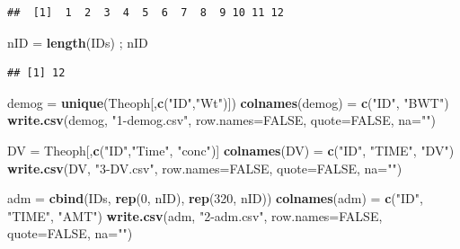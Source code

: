 \documentclass[11pt,]{krantz}
\makeatletter
\newenvironment{Shaded}{\begin{snugshade}}{\end{snugshade}}
\newcommand{\KeywordTok}[1]{\textcolor[rgb]{0.13,0.29,0.53}{\textbf{#1}}}
\newcommand{\DataTypeTok}[1]{\textcolor[rgb]{0.13,0.29,0.53}{#1}}
\newcommand{\DecValTok}[1]{\textcolor[rgb]{0.00,0.00,0.81}{#1}}
\newcommand{\StringTok}[1]{\textcolor[rgb]{0.31,0.60,0.02}{#1}}
\newcommand{\OtherTok}[1]{\textcolor[rgb]{0.56,0.35,0.01}{#1}}
\newcommand{\NormalTok}[1]{#1}
\newenvironment{kframe}{%
\medskip{}
\setlength{\fboxsep}{.8em}
 \def\at@end@of@kframe{}%
 \ifinner\ifhmode%
  \def\at@end@of@kframe{\end{minipage}}%
  \begin{minipage}{\columnwidth}%
 \fi\fi%
 \def\FrameCommand##1{\hskip\@totalleftmargin \hskip-\fboxsep
 \colorbox{shadecolor}{##1}\hskip-\fboxsep
     \hskip-\linewidth \hskip-\@totalleftmargin \hskip\columnwidth}%
 \MakeFramed {\advance\hsize-\width
   \@totalleftmargin\z@ \linewidth\hsize
   \@setminipage}}%
 {\par\unskip\endMakeFramed%
 \at@end@of@kframe}
\renewenvironment{Shaded}{\begin{kframe}}{\end{kframe}}
\theoremstyle{definition}
\theoremstyle{definition}
\theoremstyle{remark}
\makeatother
\begin{document}
\begin{verbatim}
##  [1]  1  2  3  4  5  6  7  8  9 10 11 12
\end{verbatim}

\begin{Shaded}
\begin{Highlighting}[]
\NormalTok{nID =}\StringTok{ }\KeywordTok{length}\NormalTok{(IDs) ; nID}
\end{Highlighting}
\end{Shaded}

\begin{verbatim}
## [1] 12
\end{verbatim}

\begin{Shaded}
\begin{Highlighting}[]
\NormalTok{demog =}\StringTok{ }\KeywordTok{unique}\NormalTok{(Theoph[,}\KeywordTok{c}\NormalTok{(}\StringTok{"ID"}\NormalTok{,}\StringTok{"Wt"}\NormalTok{)])}
\KeywordTok{colnames}\NormalTok{(demog) =}\StringTok{ }\KeywordTok{c}\NormalTok{(}\StringTok{"ID"}\NormalTok{, }\StringTok{"BWT"}\NormalTok{)}
\KeywordTok{write.csv}\NormalTok{(demog, }\StringTok{"1-demog.csv"}\NormalTok{, }\DataTypeTok{row.names=}\OtherTok{FALSE}\NormalTok{, }\DataTypeTok{quote=}\OtherTok{FALSE}\NormalTok{, }\DataTypeTok{na=}\StringTok{""}\NormalTok{)}

\NormalTok{DV =}\StringTok{ }\NormalTok{Theoph[,}\KeywordTok{c}\NormalTok{(}\StringTok{"ID"}\NormalTok{,}\StringTok{"Time"}\NormalTok{, }\StringTok{"conc"}\NormalTok{)]}
\KeywordTok{colnames}\NormalTok{(DV) =}\StringTok{ }\KeywordTok{c}\NormalTok{(}\StringTok{"ID"}\NormalTok{, }\StringTok{"TIME"}\NormalTok{, }\StringTok{"DV"}\NormalTok{)}
\KeywordTok{write.csv}\NormalTok{(DV, }\StringTok{"3-DV.csv"}\NormalTok{, }\DataTypeTok{row.names=}\OtherTok{FALSE}\NormalTok{, }\DataTypeTok{quote=}\OtherTok{FALSE}\NormalTok{, }\DataTypeTok{na=}\StringTok{""}\NormalTok{)}

\NormalTok{adm =}\StringTok{ }\KeywordTok{cbind}\NormalTok{(IDs, }\KeywordTok{rep}\NormalTok{(}\DecValTok{0}\NormalTok{, nID), }\KeywordTok{rep}\NormalTok{(}\DecValTok{320}\NormalTok{, nID))}
\KeywordTok{colnames}\NormalTok{(adm) =}\StringTok{ }\KeywordTok{c}\NormalTok{(}\StringTok{"ID"}\NormalTok{, }\StringTok{"TIME"}\NormalTok{, }\StringTok{"AMT"}\NormalTok{)}
\KeywordTok{write.csv}\NormalTok{(adm, }\StringTok{"2-adm.csv"}\NormalTok{, }\DataTypeTok{row.names=}\OtherTok{FALSE}\NormalTok{, }\DataTypeTok{quote=}\OtherTok{FALSE}\NormalTok{, }\DataTypeTok{na=}\StringTok{""}\NormalTok{)}


\end{Highlighting}
\end{Shaded}
\end{document}
